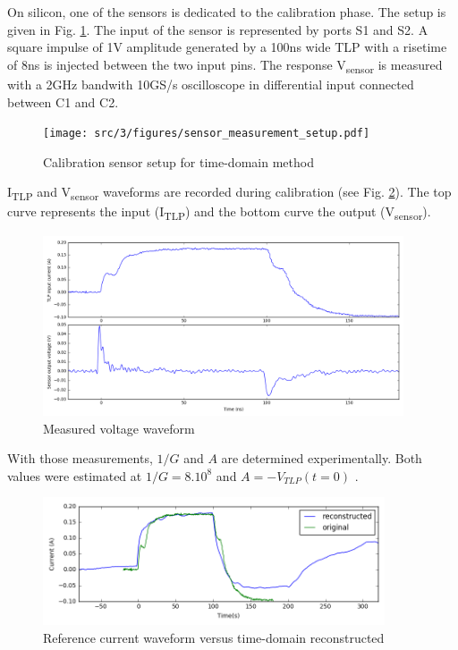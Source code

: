 On silicon, one of the sensors is dedicated to the calibration phase.
The setup is given in Fig. \ref{fig:calibration-sensor}.
The input of the sensor is represented by ports S1 and S2.
A square impulse of 1V amplitude generated by a 100ns wide TLP with a risetime of 8ns is injected between the two input pins.
The response V\textsubscript{sensor} is measured with a 2GHz bandwith 10GS/s oscilloscope in differential input connected between C1 and C2.

\begin{figure}[!h]
  \centering
  \texttt{[image: src/3/figures/sensor\_measurement\_setup.pdf]}
  \caption{Calibration sensor setup for time-domain method}
  \label{fig:calibration-sensor}
\end{figure}

I\textsubscript{TLP} and V\textsubscript{sensor} waveforms are recorded during calibration (see Fig. \ref{fig:measurement-nfs}).
The top curve represents the input (I\textsubscript{TLP}) and the bottom curve the output (V\textsubscript{sensor}).

\begin{figure}[!h]
  \centering
  \includegraphics[width=0.95\textwidth]{src/3/figures/measured_waveform.png}
  \caption{Measured voltage waveform}
  \label{fig:measurement-nfs}
\end{figure}

With those measurements, $1/G$ and $A$ are determined experimentally.
Both values were estimated at $1/G = 8.10^8$ and $A = -V_{TLP}(t = 0)$ .

\begin{figure}[!h]
  \centering
  \includegraphics[width=0.9\textwidth]{src/3/figures/time_domain_vs_ref.png}
  \caption{Reference current waveform versus time-domain reconstructed}
  \label{fig:time-domain-reconstructed}
\end{figure}

